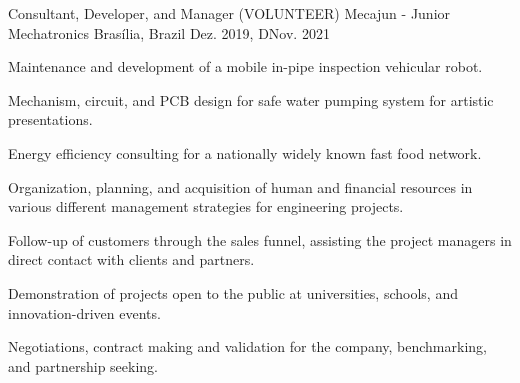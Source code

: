 \begin{cventries}
  \cventry
    {Consultant, Developer, and Manager (VOLUNTEER)} %
    {Mecajun - Junior Mechatronics} %
    {Brasília, Brazil} %
    {Dez. 2019, DNov. 2021} %
    {
      \begin{cvitems} %
        \item {Maintenance and development of a mobile in-pipe inspection vehicular robot.}
        \item {Mechanism, circuit, and PCB design for safe water pumping system for artistic presentations.}
        \item {Energy efficiency consulting for a nationally widely known fast food network.}
        \item {Organization, planning, and acquisition of human and financial resources in various different management strategies for engineering projects.}
        \item {Follow-up of customers through the sales funnel, assisting the project managers in direct contact with clients and partners.}
        \item {Demonstration of projects open to the public at universities, schools, and innovation-driven events.}
        \item {Negotiations, contract making and validation for the company, benchmarking, and partnership seeking.}
      \end{cvitems}
    }

\end{cventries}